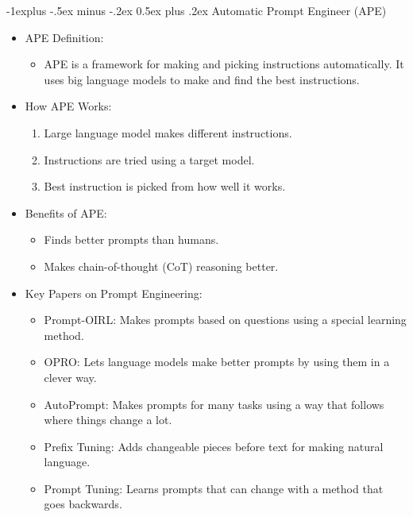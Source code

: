 \documentclass[10pt,landscape]{article}
\makeatletter
\renewcommand{\subsection}{\@startsection{subsection}{2}{0mm}%
                                {-1explus -.5ex minus -.2ex}%
                                {0.5ex plus .2ex}%
                                {\normalfont\normalsize\bfseries}}
\makeatother
\begin{document}
\begin{multicols}{3}
\subsection{Automatic Prompt Engineer (APE)}
\begin{itemize}
    \item APE Definition:
    \begin{itemize}
        \item APE is a framework for making and picking instructions automatically. It uses big language models to make and find the best instructions.
    \end{itemize}
    \item How APE Works:
    \begin{enumerate}
        \item Large language model makes different instructions.
        \item Instructions are tried using a target model.
        \item Best instruction is picked from how well it works.
    \end{enumerate}
    \item Benefits of APE:
    \begin{itemize}
        \item Finds better prompts than humans.
        \item Makes chain-of-thought (CoT) reasoning better.
    \end{itemize}
    \item Key Papers on Prompt Engineering:
    \begin{itemize}
        \item Prompt-OIRL: Makes prompts based on questions using a special learning method.
        \item OPRO: Lets language models make better prompts by using them in a clever way.
        \item AutoPrompt: Makes prompts for many tasks using a way that follows where things change a lot.
        \item Prefix Tuning: Adds changeable pieces before text for making natural language.
        \item Prompt Tuning: Learns prompts that can change with a method that goes backwards.
    \end{itemize}
\end{itemize}



\end{multicols}
\end{document}

